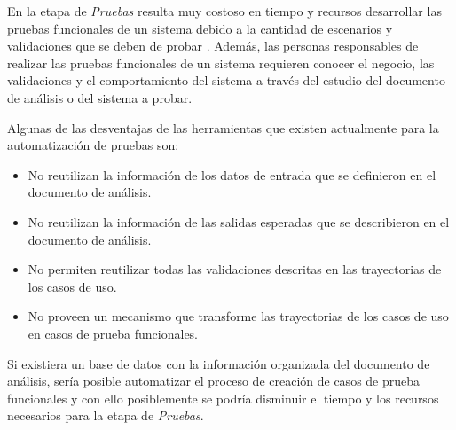 

	En la etapa de {\it Pruebas} resulta muy costoso en tiempo y recursos desarrollar las pruebas funcionales de un sistema debido a la cantidad de escenarios y validaciones que se deben de probar \cite{pressman2005software}. Además, las personas responsables de realizar las pruebas funcionales de un sistema requieren conocer el negocio, las validaciones y el comportamiento del sistema a través del estudio del documento de análisis o del sistema a probar.
	
	Algunas de las desventajas de las herramientas que existen actualmente para la automatización de pruebas son:
	
\begin{itemize}
 \item No reutilizan la información de los datos de entrada que se definieron en el documento de análisis.
 \item No reutilizan la información de las salidas esperadas que se describieron en el documento de análisis.
 \item No permiten reutilizar todas las validaciones descritas en las trayectorias de los casos de uso.
 \item No proveen un mecanismo que transforme las trayectorias de los casos de uso en casos de prueba funcionales.
\end{itemize}

Si existiera un base de datos con la información organizada del documento de análisis, sería posible automatizar el proceso de creación de casos de prueba funcionales y con ello posiblemente se podría disminuir el tiempo y los recursos necesarios para la etapa de {\it Pruebas}.